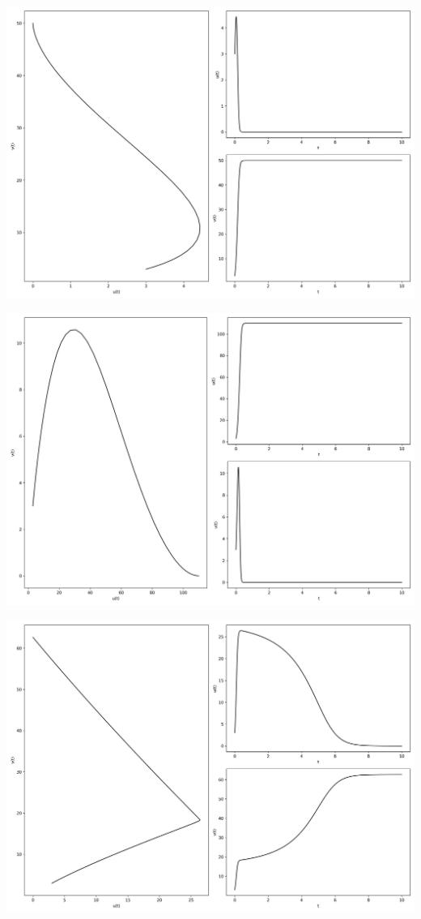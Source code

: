 \documentclass[12pt,a4paper]{jsarticle}
\makeatletter
\def\figcaption{\def\@captype{figure}\caption}
\makeatother
\begin{document}
\includegraphics[scale=0.33]{u3,0v3,0a114,0b1-1,1c1-0,9a220,0b2-0,5c2-0,4t1,00e+01n1,00e+03.png}
\figcaption{$u_0=3.00, v_0=3.00, a_1=14.00, b_1=-1.10, c_1=-0.90, a_2=20.00, b_2=-0.50, c_2-=0.40, T = 10, N = 1000$}
\includegraphics[scale=0.33]{u3,0v3,0a122,0b1-0,2c1-0,4a217,0b2-0,5c2-0,3t1,00e+01n1,00e+03.png}
\figcaption{$u_0=3.00, v_0=3.00, a_1=22.00, b_1=-0.20, c_1=-0.40, a_2=17.00, b_2=-0.50, c_2=-0.30, T = 10, N = 1000$}
\includegraphics[scale=0.33]{u3,0v3,0a123,2b1-0,6c1-0,4a218,8b2-0,5c2-0,3t1,00e+01n1,00e+03.png}
\end{document}
